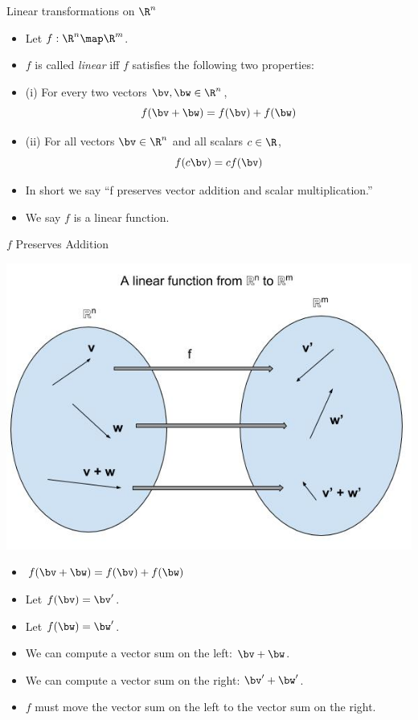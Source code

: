 \documentclass{beamer}
\begin{document}
\begin{frame}{Linear transformations on $\R^n$}

\begin{itemize}
\item Let $f:\R^n \map \R^m$.
\item $f$ is called \emph{linear} iff $f$ satisfies the following two properties:
\item (i) For every two vectors $\bv, \bw \in\R^n$, $$f(\bv + \bw) = f(\bv) + f(\bw)$$
\item (ii) For all vectors $\bv\in\R^n$ and all scalars $c\in \R$,
$$f(c \bv) = c f(\bv)$$
\item In short we say ``f preserves vector addition and scalar multiplication.''
\item We say $f$ is a linear function.
\end{itemize}

\end{frame}

\begin{frame}{$f$ Preserves Addition}

\begin{center}
\includegraphics[scale=0.25]{preserving-addition}
\end{center}

\begin{itemize}
\item $f(\bv + \bw) = f(\bv) + f(\bw)$
\item Let $f(\bv) = \bv^{\prime}$.
\item Let $f(\bw) = \bw^{\prime}$.
\item We can compute a vector sum on the left: $\bv + \bw$.
\item We can compute a vector sum on the right: $\bv^{\prime} + \bw^{\prime}$.
\item $f$ must move the vector sum on the left to the vector sum on the right.
\end{itemize}

\end{frame}
\end{document}
